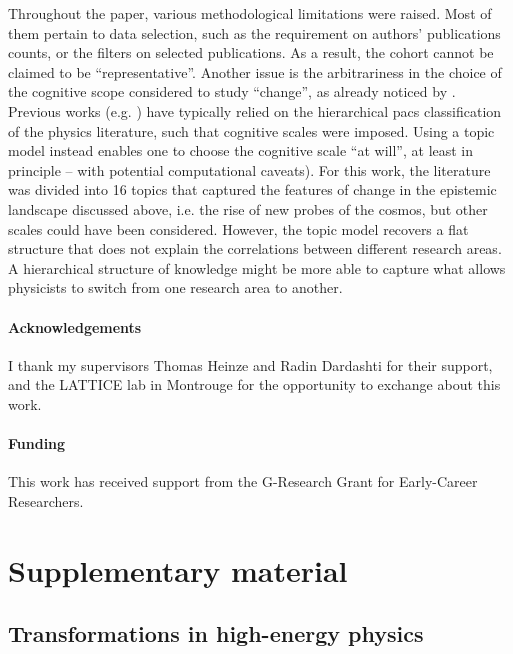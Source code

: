 \documentclass{article}
\begin{document}
Throughout the paper, various methodological limitations were raised. Most of them pertain to data selection, such as the requirement on authors' publications counts, or the filters on selected publications. As a result, the cohort cannot be claimed to be ``representative''. Another issue is the arbitrariness in the choice of the cognitive scope considered to study ``change'', as already noticed by \citet{Gieryn1978}. Previous works (e.g. \citealt{Tripodi2020,Aleta2019,Battiston2019,Jia2017}) have typically relied on the hierarchical \gls{pacs} classification of the physics literature, such that cognitive scales were imposed. Using a topic model instead enables one to choose the cognitive scale ``at will'', at least in principle -- with potential computational caveats). For this work, the literature was divided into 16 topics that captured the features of change in the epistemic landscape discussed above, i.e. the rise of new probes of the cosmos, but other scales could have been considered. However, the topic model recovers a flat structure that does not explain the correlations between different research areas. A hierarchical structure of knowledge might be more able to capture what allows physicists to switch from one research area to another.


\paragraph{Acknowledgements}{I thank my supervisors Thomas Heinze and Radin Dardashti for their support, and the LATTICE lab in Montrouge for the opportunity to exchange about this work.}

\paragraph{Funding}{This work has received support from the G-Research Grant for Early-Career Researchers.}

\printbibliography

\newpage

\appendix

\section{Supplementary material}

\subsection{\label{appendix:landscape}Transformations in high-energy physics}
\end{document}
